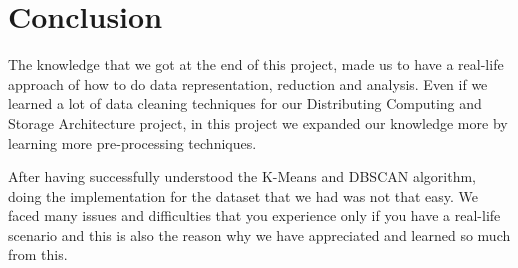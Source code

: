 \documentclass{article}
\begin{document}
\newpage
\section{Conclusion}
The knowledge that we got at the end of this project, made us to have a real-life approach of how to do data representation, reduction and analysis. Even if we learned a lot of data cleaning techniques for our Distributing Computing and Storage Architecture project, in this project we expanded our knowledge more by learning more pre-processing techniques. 

After having successfully understood the K-Means and DBSCAN algorithm, doing the implementation for the dataset that we had was not that easy. We faced many issues and difficulties that you experience only if you have a real-life scenario and this is also the reason why we have appreciated and learned so much from this.


\newpage


\nocite{*}
\end{document}
